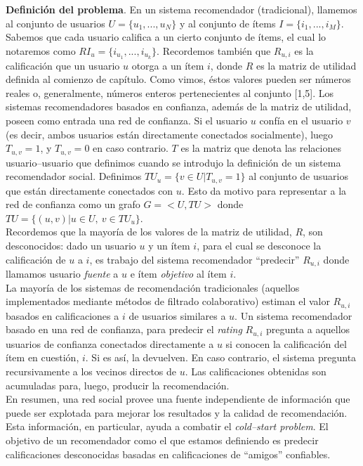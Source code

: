 			\textbf{Definición del problema}. En un sistema recomendador (tradicional), llamemos al conjunto de usuarios $U = \{u_1,...,u_N\}$ y al conjunto de ítems $I = \{i_1,...,i_M\}$. Sabemos que cada usuario califica a un cierto conjunto de ítems, el cual lo notaremos como $RI_u = \{i_{u_1},...,i_{u_k}\}$. Recordemos también que $R_{u,i}$ es la calificación que un usuario $u$ otorga a un ítem $i$, donde $R$ es la matriz de utilidad definida al comienzo de capítulo. Como vimos, éstos valores pueden ser números reales o, generalmente, números enteros pertenecientes al conjunto [1,5]. Los sistemas recomendadores basados en confianza, además de la matriz de utilidad, poseen como entrada una red de confianza. Si el usuario $u$ confía en el usuario $v$ (es decir, ambos usuarios están directamente conectados socialmente), luego $T_{u,v} = 1$, y $T_{u,v} = 0$ en caso contrario. $T$ es la matriz que denota las relaciones usuario--usuario que definimos cuando se introdujo la definición de un sistema recomendador social. Definimos $TU_u = \{v \in U | T_{u,v} = 1\}$ al conjunto de usuarios que están directamente conectados con $u$. Esto da motivo para representar a la red de confianza como un grafo $G = <U,TU>$ donde $TU = \{(u,v) | u \in U, \ v \in TU_u \}$. \\
			Recordemos que la mayoría de los valores de la matriz de utilidad, $R$, son desconocidos: dado un usuario $u$ y un ítem $i$, para el cual se desconoce la calificación de $u$ a $i$, es trabajo del sistema recomendador \enquote{predecir} $R_{u,i}$ donde llamamos usuario \textit{fuente} a $u$ e ítem \textit{objetivo} al ítem $i$. \\
			La mayoría de los sistemas de recomendación tradicionales (aquellos implementados mediante métodos de filtrado colaborativo) estiman el valor $R_{u,i}$ basados en calificaciones a $i$ de usuarios similares a $u$. Un sistema recomendador basado en una red de confianza, para predecir el \textit{rating} $R_{u,i}$ pregunta a aquellos usuarios de confianza conectados directamente a $u$ si conocen la calificación del ítem en cuestión, $i$. Si es así, la devuelven. En caso contrario, el sistema pregunta recursivamente a los vecinos directos de $u$. Las calificaciones obtenidas son acumuladas para, luego, producir la recomendación. \\
			En resumen, una red social provee una fuente independiente de información que puede ser explotada para mejorar los resultados y la calidad de recomendación. Esta información, en particular, ayuda a combatir el \textit{cold--start problem}. El objetivo de un recomendador como el que estamos definiendo es predecir calificaciones desconocidas basadas en calificaciones de \enquote{amigos} confiables. \par
			
